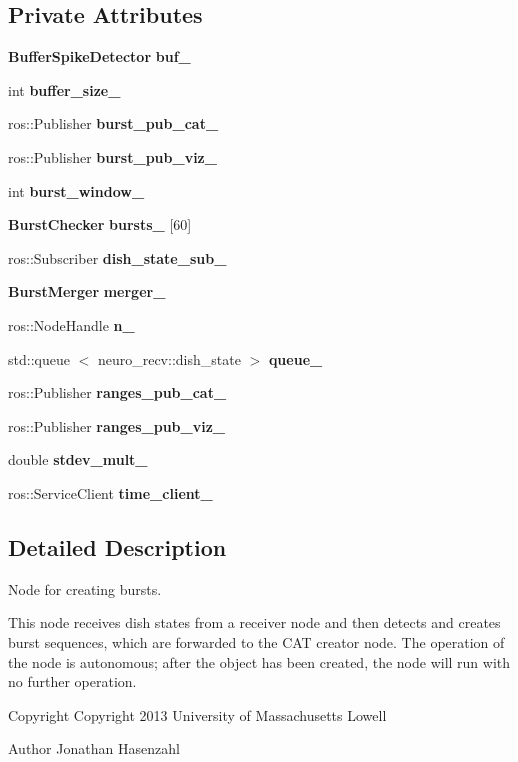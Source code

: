 \subsection*{\-Private \-Attributes}
\begin{DoxyCompactItemize}
\item 
{\bf \-Buffer\-Spike\-Detector} {\bf buf\-\_\-}
\item 
int {\bf buffer\-\_\-size\-\_\-}
\item 
ros\-::\-Publisher {\bf burst\-\_\-pub\-\_\-cat\-\_\-}
\item 
ros\-::\-Publisher {\bf burst\-\_\-pub\-\_\-viz\-\_\-}
\item 
int {\bf burst\-\_\-window\-\_\-}
\item 
{\bf \-Burst\-Checker} {\bf bursts\-\_\-} [60]
\item 
ros\-::\-Subscriber {\bf dish\-\_\-state\-\_\-sub\-\_\-}
\item 
{\bf \-Burst\-Merger} {\bf merger\-\_\-}
\item 
ros\-::\-Node\-Handle {\bf n\-\_\-}
\item 
std\-::queue\*
$<$ neuro\-\_\-recv\-::dish\-\_\-state $>$ {\bf queue\-\_\-}
\item 
ros\-::\-Publisher {\bf ranges\-\_\-pub\-\_\-cat\-\_\-}
\item 
ros\-::\-Publisher {\bf ranges\-\_\-pub\-\_\-viz\-\_\-}
\item 
double {\bf stdev\-\_\-mult\-\_\-}
\item 
ros\-::\-Service\-Client {\bf time\-\_\-client\-\_\-}
\end{DoxyCompactItemize}


\subsection{\-Detailed \-Description}
\-Node for creating bursts. 

\-This node receives dish states from a receiver node and then detects and creates burst sequences, which are forwarded to the \-C\-A\-T creator node. \-The operation of the node is autonomous; after the object has been created, the node will run with no further operation.

\begin{DoxyCopyright}{\-Copyright}
\-Copyright 2013 \-University of \-Massachusetts \-Lowell 
\end{DoxyCopyright}
\begin{DoxyAuthor}{\-Author}
\-Jonathan \-Hasenzahl 
\end{DoxyAuthor}


